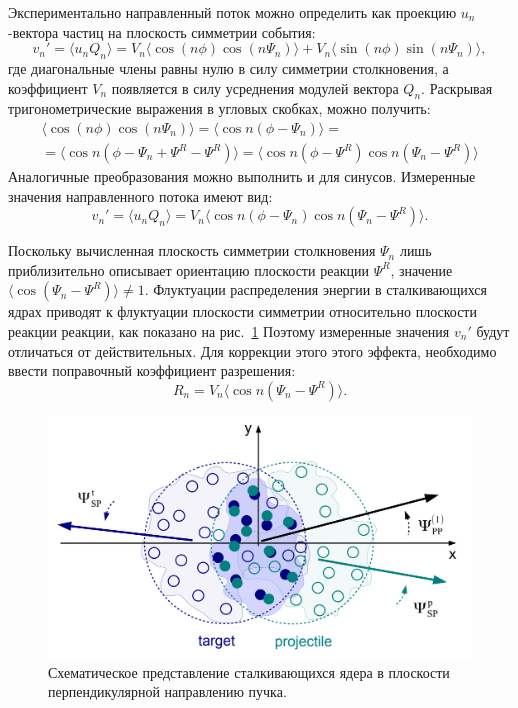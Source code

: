 Экспериментально направленный поток можно определить как проекцию $u_n$-вектора частиц на плоскость симметрии события:
%
\begin{equation}
    v_n' =  \langle u_n Q_n \rangle = 
    V_n \langle \cos (n\phi) \cos (n\Psi_n) \rangle + V_n \langle \sin(n\phi) \sin(n\Psi_n) \rangle,
\end{equation}
%
где диагональные члены равны нулю в силу симметрии столкновения, а коэффициент $V_n$ появляется в силу усреднения модулей вектора $Q_n$.
Раскрывая тригонометрические выражения в угловых скобках, можно получить:
%
\begin{equation}
\begin{align}
    \langle \cos (n\phi) \cos (n\Psi_n) \rangle = \langle \cos n ( \phi - \Psi_n ) \rangle = \\
    = \langle \cos n ( \phi - \Psi_n + \Psi^R - \Psi^R ) \rangle =
    \langle \cos n ( \phi - \Psi^R ) \cos n (\Psi_n - \Psi^R ) \rangle
\end{align}
\end{equation}
%
Аналогичные преобразования можно выполнить и для синусов. 
Измеренные значения направленного потока имеют вид:
%
\begin{equation}
    v_n' =  \langle u_n Q_n \rangle = 
    V_n \langle \cos n ( \phi - \Psi_n ) \cos n (\Psi_n - \Psi^R) \rangle.
    \label{eq:uq_transformation}
\end{equation}
%

Поскольку вычисленная плоскость симметрии столкновения $\Psi_n$ лишь приблизительно описывает ориентацию плоскости реакции $\Psi^R$, значение $ \langle \cos(\Psi_n - \Psi^R) \rangle \ne 1 $.
Флуктуации распределения энергии в сталкивающихся ядрах приводят к флуктуации плоскости симметрии относительно плоскости реакции реакции, как показано на рис.~\ref{fig:pp_sp_rp}
Поэтому измеренные значения $v_n'$ будут отличаться от действительных.
Для коррекции этого этого эффекта, необходимо ввести поправочный коэффициент разрешения:
%
\begin{equation}
    R_n = V_n \langle \cos n (\Psi_n - \Psi^R) \rangle.
\end{equation}
%

%
\begin{figure}[ht]
\begin{center}
\includegraphics[width=0.75\linewidth]{images/v1_pp_sp.png}
\caption{Схематическое представление сталкивающихся ядера в плоскости перпендикулярной направлению пучка.}
\label{fig:pp_sp_rp}
\end{center}
\end{figure}
%


